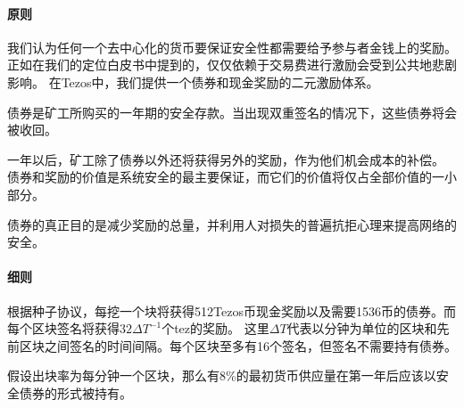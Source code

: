 \documentclass[letterpaper]{article}
\newcommand{\tz}{{\fontspec{DejaVu Sans} \small{ꜩ}}}
\begin{document}
\paragraph{原则}
我们认为任何一个去中心化的货币要保证安全性都需要给予参与者金钱上的奖励。
正如在我们的定位白皮书中提到的，仅仅依赖于交易费进行激励会受到公共地悲剧影响。
在Tezos中，我们提供一个债券和现金奖励的二元激励体系。

债券是矿工所购买的一年期的安全存款。当出现双重签名的情况下，这些债券将会被收回。

一年以后，矿工除了债券以外还将获得另外的奖励，作为他们机会成本的补偿。
债券和奖励的价值是系统安全的最主要保证，而它们的价值将仅占全部价值的一小部分。

债券的真正目的是减少奖励的总量，并利用人对损失的普遍抗拒心理来提高网络的安全。

\paragraph{细则}
根据种子协议，每挖一个块将获得512Tezos币现金奖励以及需要1536币的债券。而每个区块签名将获得$32\Delta T^{-1}$个tez的奖励。
这里$\Delta T$代表以分钟为单位的区块和先前区块之间签名的时间间隔。每个区块至多有16个签名，但签名不需要持有债券。

假设出块率为每分钟一个区块，那么有8\%的最初货币供应量在第一年后应该以安全债券的形式被持有。
\end{document}
